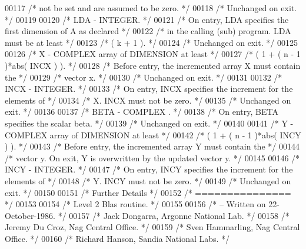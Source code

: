 \begin{DoxyCode}
00117 \textcolor{comment}{/*           not be set and are assumed to be zero. */}
00118 \textcolor{comment}{/*           Unchanged on exit. */}
00119 
00120 \textcolor{comment}{/*  LDA    - INTEGER. */}
00121 \textcolor{comment}{/*           On entry, LDA specifies the first dimension of A as declared */}
00122 \textcolor{comment}{/*           in the calling (sub) program. LDA must be at least */}
00123 \textcolor{comment}{/*           ( k + 1 ). */}
00124 \textcolor{comment}{/*           Unchanged on exit. */}
00125 
00126 \textcolor{comment}{/*  X      - COMPLEX          array of DIMENSION at least */}
00127 \textcolor{comment}{/*           ( 1 + ( n - 1 )*abs( INCX ) ). */}
00128 \textcolor{comment}{/*           Before entry, the incremented array X must contain the */}
00129 \textcolor{comment}{/*           vector x. */}
00130 \textcolor{comment}{/*           Unchanged on exit. */}
00131 
00132 \textcolor{comment}{/*  INCX   - INTEGER. */}
00133 \textcolor{comment}{/*           On entry, INCX specifies the increment for the elements of */}
00134 \textcolor{comment}{/*           X. INCX must not be zero. */}
00135 \textcolor{comment}{/*           Unchanged on exit. */}
00136 
00137 \textcolor{comment}{/*  BETA   - COMPLEX         . */}
00138 \textcolor{comment}{/*           On entry, BETA specifies the scalar beta. */}
00139 \textcolor{comment}{/*           Unchanged on exit. */}
00140 
00141 \textcolor{comment}{/*  Y      - COMPLEX          array of DIMENSION at least */}
00142 \textcolor{comment}{/*           ( 1 + ( n - 1 )*abs( INCY ) ). */}
00143 \textcolor{comment}{/*           Before entry, the incremented array Y must contain the */}
00144 \textcolor{comment}{/*           vector y. On exit, Y is overwritten by the updated vector y. */}
00145 
00146 \textcolor{comment}{/*  INCY   - INTEGER. */}
00147 \textcolor{comment}{/*           On entry, INCY specifies the increment for the elements of */}
00148 \textcolor{comment}{/*           Y. INCY must not be zero. */}
00149 \textcolor{comment}{/*           Unchanged on exit. */}
00150 
00151 \textcolor{comment}{/*  Further Details */}
00152 \textcolor{comment}{/*  =============== */}
00153 
00154 \textcolor{comment}{/*  Level 2 Blas routine. */}
00155 
00156 \textcolor{comment}{/*  -- Written on 22-October-1986. */}
00157 \textcolor{comment}{/*     Jack Dongarra, Argonne National Lab. */}
00158 \textcolor{comment}{/*     Jeremy Du Croz, Nag Central Office. */}
00159 \textcolor{comment}{/*     Sven Hammarling, Nag Central Office. */}
00160 \textcolor{comment}{/*     Richard Hanson, Sandia National Labs. */}

\end{DoxyCode}
